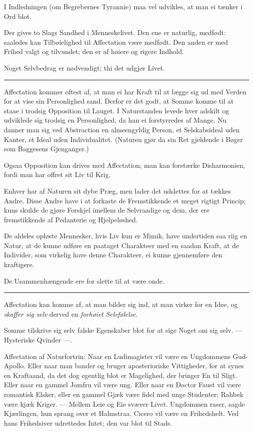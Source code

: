 \documentclass[12pt]{article}
\newcommand{\opage}[1]{\marginnote{\footnotesize\textit{[#1]}}}
\newcommand{\ombreak}{\par\medskip\begin{center}\rule{0.32\textwidth}{0.4pt}\end{center}\medskip}
\begin{document}
I Indledningen (om Begrebernes Tyrannie) maa vel udvikles, at man ei tænker i Ord blot.

Der gives to Slags Sandhed i Menneskelivet. Den ene er naturlig, medfødt: saaledes kan Tilbøielighed til Affectation være medfødt. Den anden er med Frihed valgt og tilvundet; den er af høiere og rigere Indhold.

Noget Selvbedrag er nødvendigt; thi det udgjør Livet.

\ombreak

Affectation kommer oftest af, at man ei har Kraft til at lægge sig ud med Verden for at vise sin Personlighed sand. Derfor er det godt, at Somme komme til at staae i trodsig Opposition til Lauget. I Naturstanden levede hver adskilt og udviklede sig trodsig en Personlighed, da han ei forstyrredes af Mange. Nu danner man sig ved Abstraction en almeengyldig \opage{177}Person, et Selskabsideal uden Kanter, et Ideal uden Individualitet. (Naturen gjør da sin Ret gjeldende i Bøger som Baggesens Gjenganger.)

Ogsaa Opposition kan drives med Affectation; man kan forstærke Disharmonien, fordi man har offret sit Liv til Krig.

Enhver har af Naturen sit dybe Præg, men lader det udslettes for at tækkes Andre. Disse Andre have i at forkaste de Fremstikkende et meget rigtigt Princip; kuns skulde de gjøre Forskjel imellem de Selvraadige og dem, der ere fremstikkende af Pedanterie og Hjelpeløshed.

De aldeles opløste Mennesker, hvis Liv kun er Mimik, have undertiden saa riig en Natur, at de kunne udføre en paataget Charakteer med en saadan Kraft, at de Individer, som virkelig have denne Charakteer, ei kunne gjennemføre den kraftigere.

De Usammenhængende ere for slette til at være onde.

\ombreak

Affectation kan komme af, at man bilder sig ind, at man virker for en Idee, og \emph{skaffer sig selv} derved en \emph{forhøiet Selvfølelse}.

Somme tilskrive sig selv falske Egenskaber blot for at sige Noget om sig selv. --- Hysteriske Qvinder ---.

Affectation af Naturfortrin: Naar en Ludimagister vil være en Ungdommens Gud-Apollo. Eller naar man bander og bruger aposterioriske Vittigheder, for at synes en Kraftaand, da det dog egentlig blot er Magelighed, der bringer En til Sligt. Eller \opage{178}naar en gammel Jomfru vil være ung. Eller naar en Doctor Faust vil være romantisk Elsker, eller en gammel Gjæk være fidel med unge Studenter; Rahbek være kjæk Kriger. --- Mellem Leie og Eie svæver Livet. Ungdommen raser, sagde Kjærlingen, hun sprang over et Halmstraa. Cicero vil være en Frihedshelt. Ved hans Frihedsiver udrettedes Intet; den var blot til Stads.
\end{document}
